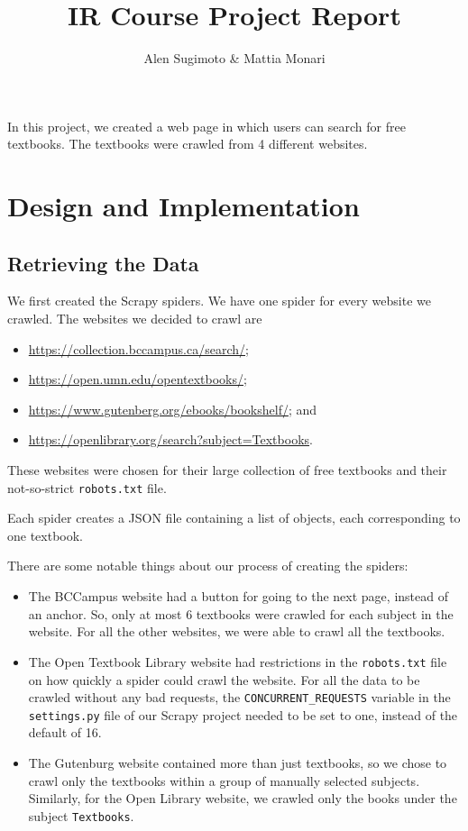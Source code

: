 \documentclass[a4paper,10pt]{report}
\title{IR Course Project Report}
\author{Alen Sugimoto \& Mattia Monari}
\begin{document}
\maketitle

In this project, we created a web page in which users can search for free textbooks.
The textbooks were crawled from 4 different websites.

\section*{Design and Implementation}

\subsection*{Retrieving the Data}

We first created the Scrapy spiders. We have one spider for every website we crawled. The websites we decided to crawl are

\begin{itemize}
\item \url{https://collection.bccampus.ca/search/};
\item \url{https://open.umn.edu/opentextbooks/};
\item \url{https://www.gutenberg.org/ebooks/bookshelf/}; and
\item \url{https://openlibrary.org/search?subject=Textbooks}.
\end{itemize}

These websites were chosen for their large collection of free textbooks and their not-so-strict \verb|robots.txt| file.

Each spider creates a JSON file containing a list of objects, each corresponding to one textbook.

There are some notable things about our process of creating the spiders:

\begin{itemize}

\item The BCCampus website had a button for going to the next page, instead of an anchor. So, only at most 6 textbooks were crawled for each subject in the website. For all the other websites, we were able to crawl all the textbooks.

\item The Open Textbook Library website had restrictions in the \verb|robots.txt| file on how quickly a spider could crawl the website. For all the data to be crawled without any bad requests, the \verb|CONCURRENT_REQUESTS| variable in the \verb|settings.py| file of our Scrapy project needed to be set to one, instead of the default of 16.

\item The Gutenburg website contained more than just textbooks, so we chose to crawl only the textbooks within a group of manually selected subjects. Similarly, for the Open Library website, we crawled only the books under the subject \verb|Textbooks|.

\end{itemize}
\end{document}
